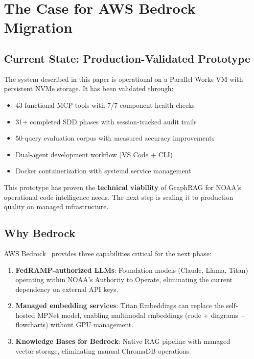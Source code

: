 \documentclass[11pt,letterpaper]{article}
\begin{document}
\section{The Case for AWS Bedrock Migration}
\label{sec:bedrock}

\subsection{Current State: Production-Validated Prototype}

The system described in this paper is operational on a Parallel Works VM
with persistent NVMe storage. It has been validated through:

\begin{itemize}[nosep]
    \item 43 functional MCP tools with 7/7 component health checks
    \item 31+ completed SDD phases with session-tracked audit trails
    \item 50-query evaluation corpus with measured accuracy improvements
    \item Dual-agent development workflow (VS Code + CLI)
    \item Docker containerization with systemd service management
\end{itemize}

This prototype has proven the \textbf{technical viability} of GraphRAG for
NOAA's operational code intelligence needs. The next step is scaling it
to production quality on managed infrastructure.

\subsection{Why Bedrock}

AWS Bedrock~\cite{aws_bedrock2024} provides three capabilities critical
for the next phase:

\begin{enumerate}[nosep]
    \item \textbf{FedRAMP-authorized LLMs}: Foundation models (Claude,
          Llama, Titan) operating within NOAA's Authority to Operate,
          eliminating the current dependency on external API keys.
    \item \textbf{Managed embedding services}: Titan Embeddings can
          replace the self-hosted MPNet model, enabling multimodal
          embeddings (code + diagrams + flowcharts) without GPU
          management.
    \item \textbf{Knowledge Bases for Bedrock}: Native RAG pipeline
          with managed vector storage, eliminating manual ChromaDB
          operations.
\end{enumerate}
\end{document}
